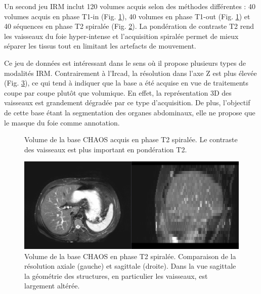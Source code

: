 Un second jeu IRM inclut 120 volumes acquis selon des méthodes différentes : 40 volumes acquis en phase T1-in (Fig. \ref{fig:T1_MRI_2}), 40 volumes  en phase T1-out (Fig. \ref{fig:T1_MRI_2}) et 40 séquences en phase T2 spiralée (Fig. \ref{fig:T2_MRI}). La pondération de contraste T2 rend les vaisseaux du foie hyper-intense et l'acquisition spiralée permet de mieux séparer les tissus tout en limitant les artefacts de mouvement.
\begin{figure}
    \centering
    \caption{}
    \label{fig:T1_MRI_2}
\end{figure}
Ce jeu de données est intéressant dans le sens où il propose plusieurs types de modalités IRM. Contrairement à l'Ircad, la résolution dans l'axe Z est plus élevée (Fig. \ref{fig:CHAOS_geometry}), ce qui tend à indiquer que la base a été acquise en vue de traitements coupe par coupe plutôt que volumique. En effet, la représentation 3D des vaisseaux est grandement dégradée par ce type d'acquisition.  De plus, l'objectif de cette base étant la segmentation des organes abdominaux, elle ne propose que le masque du foie comme annotation.
\begin{figure}
    \centering
    \caption{Volume de la base CHAOS acquis en phase T2 spiralée. Le contraste des vaisseaux est plus important en pondération T2.}
    \label{fig:T2_MRI}
\end{figure}
\begin{figure}
    \centering
    \includegraphics[width=\textwidth]{Images/CHAOS_resolution.png}
    \caption{Volume de la base CHAOS en phase T2 spiralée. Comparaison de la résolution axiale (gauche) et sagittale (droite). Dans la vue sagittale la géométrie des structures, en particulier les vaisseaux, est largement altérée.}
    \label{fig:CHAOS_geometry}
\end{figure}
